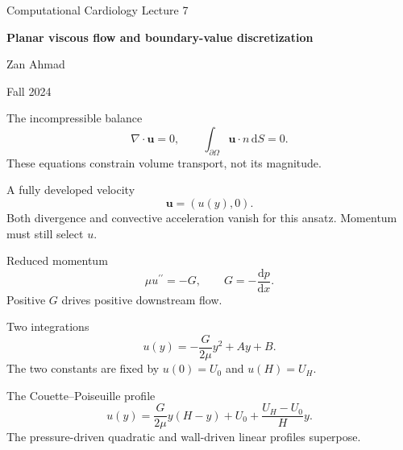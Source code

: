 \documentclass[aspectratio=169,11pt]{beamer}
\newcommand{\notestarget}{notes.pdf}\newcommand{\noteslabel}{Notes}
\begin{document}
\begin{frame}[plain]\vfill
{\small\color{accent} Computational Cardiology \quad Lecture 7}\par\medskip
{\raggedright{}\LARGE\bfseries\color{ink} Planar viscous flow and boundary-value discretization}\par\bigskip
Zan Ahmad\par\smallskip
{\small Fall 2024}\par\vfill\end{frame}
\renewcommand{\notestarget}{notes.pdf\#note-incompressibility-and-the-missing-momentum-equation}
\begin{frame}[t,fragile,label=slide-the-incompressible-balance]{The incompressible balance}
\[\nabla\cdot\boldsymbol u=0,\qquad\int_{\partial\Omega}\boldsymbol u\cdot n\,\mathrm dS=0.\]\pause{} These equations constrain volume transport, not its magnitude.
\end{frame}
\renewcommand{\notestarget}{notes.pdf\#note-incompressibility-and-the-missing-momentum-equation}
\begin{frame}[t,fragile,label=slide-a-fully-developed-velocity]{A fully developed velocity}
\[\boldsymbol u=(u(y),0).\]\pause{} Both divergence and convective acceleration vanish for this ansatz. Momentum must still select $u$.
\end{frame}
\renewcommand{\notestarget}{notes.pdf\#note-integration-of-the-reduced-momentum-balance}
\begin{frame}[t,fragile,label=slide-reduced-momentum]{Reduced momentum}
\[\mu u^{\prime\prime}=-G,\qquad G=-\frac{\mathrm dp}{\mathrm dx}.\]\pause{} Positive $G$ drives positive downstream flow.
\end{frame}
\renewcommand{\notestarget}{notes.pdf\#note-integration-of-the-reduced-momentum-balance}
\begin{frame}[t,fragile,label=slide-two-integrations]{Two integrations}
\[u(y)=-\frac{G}{2\mu}y^2+A y+B.\]\pause{} The two constants are fixed by $u(0)=U_0$ and $u(H)=U_H$.
\end{frame}
\renewcommand{\notestarget}{notes.pdf\#note-integration-of-the-reduced-momentum-balance}
\begin{frame}[t,fragile,label=slide-the-couette-poiseuille-profile]{The Couette--Poiseuille profile}
\[u(y)=\frac{G}{2\mu}y(H-y)+U_0+\frac{U_H-U_0}{H}y.\]\pause{} The pressure-driven quadratic and wall-driven linear profiles superpose.
\end{frame}
\renewcommand{\notestarget}{notes.pdf\#note-pressure-driven-and-moving-wall-flow}
\end{document}
